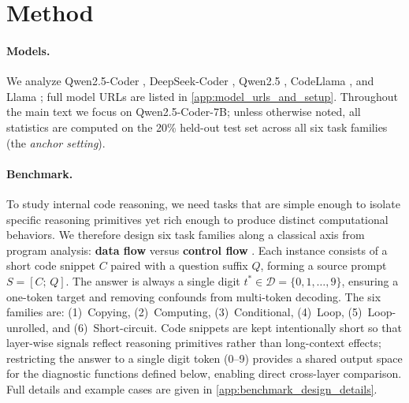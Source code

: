 \section{Method}
\label{sec:method}


\paragraph{Models.}
We analyze Qwen2.5-Coder \citep{hui2024qwen25coder}, DeepSeek-Coder \citep{guo2024deepseekcoder}, Qwen2.5 \citep{yang2024qwen25}, CodeLlama \citep{roziere2023codellama}, and Llama \citep{llama3team2024}; full model URLs are listed in \cref{app:model_urls_and_setup}. Throughout the main text we focus on Qwen2.5-Coder-7B; unless otherwise noted, all statistics are computed on the 20\% held-out test set across all six task families (the \emph{anchor setting}).


\paragraph{Benchmark.}
To study internal code reasoning, we need tasks that are simple enough to isolate specific reasoning primitives yet rich enough to produce distinct computational behaviors. We therefore design six task families along a classical axis from program analysis: \textbf{data flow} versus \textbf{control flow} \citep{aho2006compilers, allen1970control, kildall1973unified, nielson1999principles}. Each instance consists of a short code snippet $C$ paired with a question suffix $Q$, forming a source prompt $S = [C;\,Q]$. The answer is always a single digit $t^* \in \mathcal{D} = \{0,1,\dots,9\}$, ensuring a one-token target and removing confounds from multi-token decoding. The six families are: (1)~Copying, (2)~Computing, (3)~Conditional, (4)~Loop, (5)~Loop-unrolled, and (6)~Short-circuit. Code snippets are kept intentionally short so that layer-wise signals reflect reasoning primitives rather than long-context effects; restricting the answer to a single digit token (0--9) provides a shared output space for the diagnostic functions defined below, enabling direct cross-layer comparison. Full details and example cases are given in \cref{app:benchmark_design_details}.

